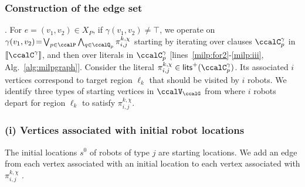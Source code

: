 \documentclass[journal]{IEEEtran}
\newcommand{\clause}[1]{\llbracket \ccalC^{#1} \rrbracket}
\renewcommand{\ap}[3]{\mathcal{\pi}_{{#1},{#2}}^{#3}}
\newcommand{\domanda}[1]{\subsubsection*{#1}}
\begin{document}
\subsubsection{Construction of  the edge set} . For $e \!= \!(v_1, v_2) \!\in \!X_{P}$, if $\gamma(v_1, v_2) \not=\top$, we operate on $\gamma(v_1, v_2) \!= \! \bigvee_{p\in \ccalP} \bigwedge_{q \in \ccalQ_{p}} \ap{i}{j}{k,\chi}$ starting by iterating over clauses $\ccalC_p^{\gamma}$ in $\clause{\gamma}$, and then over literals in $\ccalC_p^\gamma$ [lines~\ref{milp:for2}-\ref{milp:iii}, Alg.~\ref{alg:milpgraph}]. Consider the literal $\ap{i}{j}{k,\chi} \in \mathsf{lits}^+(\ccalC_p^{\gamma})$. Its associated $i$ vertices correspond to target region $\ell_k$ that should be visited by $i$ robots. We identify three types of starting vertices in $\ccalV_\ccalG$ from where $i$ robots depart for region $\ell_k$ to satisfy $\ap{i}{j}{k,\chi}$.

\domanda{(i) Vertices associated with initial robot locations}\label{sec:a}The initial locations $s^0$ of robots of type $j$ are starting locations. We add an edge from each vertex associated with an initial location to each vertex associated with $\ap{i}{j}{k,\chi}$ .
\end{document}
